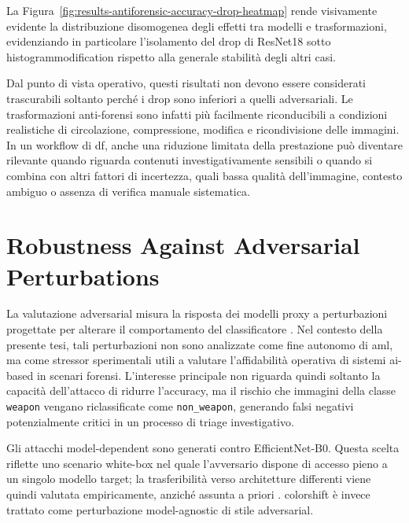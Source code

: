 La Figura~\ref{fig:results-antiforensic-accuracy-drop-heatmap} rende
visivamente evidente la distribuzione disomogenea degli effetti tra modelli e
trasformazioni, evidenziando in particolare l'isolamento del drop di ResNet18
sotto \gls{histogrammodification} rispetto alla generale stabilità degli altri
casi.

Dal punto di vista operativo, questi risultati non devono essere considerati
trascurabili soltanto perché i drop sono inferiori a quelli adversariali. Le
trasformazioni anti-forensi sono infatti più facilmente riconducibili a condizioni
realistiche di circolazione, compressione, modifica e ricondivisione delle
immagini. In un workflow di \gls{df}, anche una riduzione limitata della
prestazione può diventare rilevante quando riguarda contenuti investigativamente
sensibili o quando si combina con altri fattori di incertezza, quali bassa
qualità dell'immagine, contesto ambiguo o assenza di verifica manuale
sistematica.
\section{Robustness Against Adversarial Perturbations}
\label{sec:results-adversarial}

La valutazione adversarial misura la risposta dei modelli proxy a perturbazioni
progettate per alterare il comportamento del classificatore
\cite{szegedy2014intriguing,goodfellow2015explaining,biggio2018wild}. Nel contesto della
presente tesi, tali perturbazioni non sono analizzate come fine autonomo di
\gls{aml}, ma come stressor sperimentali utili a valutare l'affidabilità
operativa di sistemi \gls{ai}-based in scenari forensi. L'interesse principale
non riguarda quindi soltanto la capacità dell'attacco di ridurre l'accuracy, ma
il rischio che immagini della classe \texttt{weapon} vengano riclassificate come
\texttt{non\_weapon}, generando falsi negativi potenzialmente critici in un
processo di triage investigativo.

Gli attacchi model-dependent sono generati contro EfficientNet-B0. Questa scelta
riflette uno scenario white-box nel quale l'avversario dispone di accesso pieno a
un singolo modello target; la trasferibilità verso architetture differenti viene
quindi valutata empiricamente, anziché assunta a priori
\cite{biggio2018wild,nowroozi2021survey,barni2018cf}. \gls{colorshift} è
invece trattato come perturbazione model-agnostic di stile adversarial.

